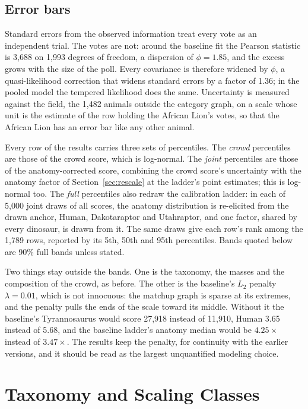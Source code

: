 \documentclass[11pt]{article}
\begin{document}
\subsection{Error bars}
\label{sec:errors}
Standard errors from the observed information treat every vote as an independent trial. The votes are not: around the baseline fit the Pearson statistic is 3,688 on 1,993 degrees of freedom, a dispersion of $\phi=1.85$, and the excess grows with the size of the poll. Every covariance is therefore widened by $\phi$, a quasi-likelihood correction that widens standard errors by a factor of 1.36; in the pooled model the tempered likelihood does the same. Uncertainty is measured against the field, the 1,482 animals outside the category graph, on a scale whose unit is the estimate of the row holding the African Lion's votes, so that the African Lion has an error bar like any other animal.

Every row of the results carries three sets of percentiles. The \emph{crowd} percentiles are those of the crowd score, which is log-normal. The \emph{joint} percentiles are those of the anatomy-corrected score, combining the crowd score's uncertainty with the anatomy factor of Section~\ref{sec:rescale} at the ladder's point estimates; this is log-normal too. The \emph{full} percentiles also redraw the calibration ladder: in each of 5,000 joint draws of all scores, the anatomy distribution is re-elicited from the drawn anchor, Human, Dakotaraptor and Utahraptor, and one factor, shared by every dinosaur, is drawn from it. The same draws give each row's rank among the 1,789 rows, reported by its 5th, 50th and 95th percentiles. Bands quoted below are 90\% full bands unless stated.

Two things stay outside the bands. One is the taxonomy, the masses and the composition of the crowd, as before. The other is the baseline's $L_2$ penalty $\lambda=0.01$, which is not innocuous: the matchup graph is sparse at its extremes, and the penalty pulls the ends of the scale toward its middle. Without it the baseline's Tyrannosaurus would score 27,918 instead of 11,910, Human 3.65 instead of 5.68, and the baseline ladder's anatomy median would be $4.25\times$ instead of $3.47\times$. The results keep the penalty, for continuity with the earlier versions, and it should be read as the largest unquantified modeling choice.

\section{Taxonomy and Scaling Classes}
\label{sec:classify}
\end{document}
